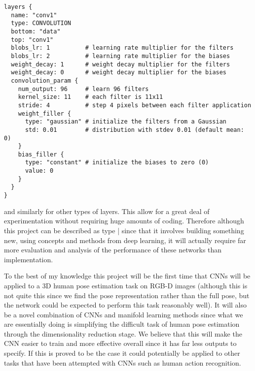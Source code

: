 \documentclass[11pt]{article} %
\begin{document}
\begin{lstlisting}
layers {
  name: "conv1"
  type: CONVOLUTION
  bottom: "data"
  top: "conv1"
  blobs_lr: 1          # learning rate multiplier for the filters
  blobs_lr: 2          # learning rate multiplier for the biases
  weight_decay: 1      # weight decay multiplier for the filters
  weight_decay: 0      # weight decay multiplier for the biases
  convolution_param {
    num_output: 96     # learn 96 filters
    kernel_size: 11    # each filter is 11x11
    stride: 4          # step 4 pixels between each filter application
    weight_filler {
      type: "gaussian" # initialize the filters from a Gaussian
      std: 0.01        # distribution with stdev 0.01 (default mean: 0)
    }
    bias_filler {
      type: "constant" # initialize the biases to zero (0)
      value: 0
    }
  }
}
\end{lstlisting}
and similarly for other types of layers. This allow for a great deal of experimentation without requiring huge amounts of coding. Therefore although this project can be described as type | since that it involves building something new, using concepts and methods from deep learning, it will actually require far more evaluation and analysis of the performance of these networks than implementation. 


To the best of my knowledge this project will be the first time that CNNs will be applied to a 3D human pose estimation task on RGB-D images (although this is not quite this since we find the pose representation rather than the full pose, but the network could be expected to perform this task reasonably well). It will also be a novel combination of CNNs and manifold learning methods since what we are essentially doing is simplifying the difficult task of human pose estimation through the dimensionality reduction stage. We believe that this will make the CNN easier to train and more effective overall since it has far less outputs to specify. If this is proved to be the case it could potentially be applied to other tasks that have been attempted with CNNs such as human action recognition.
\end{document}

